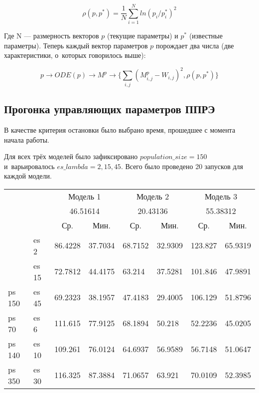 \[ \rho(p,p^*) = \frac{1}{N} \sum\limits_{i = 1}^{N} ln(p_i/p^*_i)^2 \]

Где N — размерность векторов $p$ (текущие параметры) и $p^*$ (известные параметры). 
Теперь каждый вектор параметров $p$ порождает два числа (две характеристики, 
о~которых говорилось выше):

\[ 
p \rightarrow ODE(p) \rightarrow M^p 
\rightarrow \{ \sum\limits_{i,j}(M_{i,j}^p - W_{i,j})^2 , \rho(p,p^*) \}
\]

\subsection{Прогонка управляющих параметров ППРЭ} \label{s3_2}

В качестве критерия остановки было выбрано время, прошедшее с момента начала 
работы. 

Для всех трёх моделей было зафиксировано $population\_size = 150$ 
и~варьировалось $es\_lambda = 2,15,45$. Всего было проведено 20 запусков для 
каждой модели. 

\begin{table}[h]
\begin{tabular}{|l|l|llllll}
\hline
\multicolumn{2}{|l|}{} & \multicolumn{2}{c|}{Модель 1} & \multicolumn{2}{c|}{Модель 2} & \multicolumn{2}{c|}{Модель 3} \\ \cline{3-8} 
\multicolumn{2}{|l|}{} & \multicolumn{2}{c|}{46.51614} & \multicolumn{2}{c|}{20.43136} & \multicolumn{2}{c|}{55.38312} \\ \cline{3-8} 
\multicolumn{2}{|l|}{
 \multirow{-3}{*}{}} & 
 \multicolumn{1}{c|}{Ср.} & 
 \multicolumn{1}{c|}{Мин.} & 
 \multicolumn{1}{c|}{Ср.} & 
 \multicolumn{1}{c|}{Мин.} & 
 \multicolumn{1}{c|}{Ср.} & 
 \multicolumn{1}{c|}{Мин.} \\ \hline
                         & es 2  & 86.4228 & 37.7034  & 68.7152 & 32.9309 & 123.827 & 65.9319 \\ \cline{2-2}
                         & es 15 & 72.7812 & 44.4175  & 63.214  & 37.5281 & 101.846 & 47.9891 \\ \cline{2-2}
\multirow{-3}{*}{ps 150} & es 45 & 69.2323 & 38.1957  & 47.4183 & 29.4005 & 106.129 & 51.8796 \\ \cline{1-2}
ps 70                    & es 6  & 111.615 & 77.9125 & 68.1894 & 50.218  & 52.2236 & 45.0205 \\ \cline{1-2}
ps 140                   & es 10 & 109.261 & 76.0124 & 64.6937 & 56.9589 & 56.7148 & 51.0647 \\ \cline{1-2}
ps 350                   & es 30 & 116.325 & 87.3884 & 71.0657 & 63.921  & 70.0109 & 52.3985 \\ \cline{1-2}
\end{tabular}
\end{table}
	

